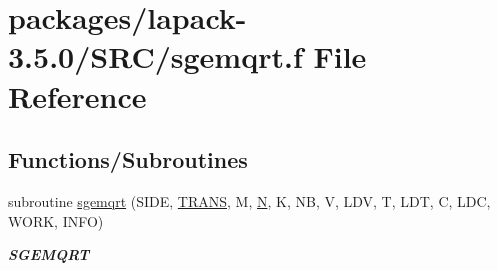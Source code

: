 \hypertarget{sgemqrt_8f}{}\section{packages/lapack-\/3.5.0/\+S\+R\+C/sgemqrt.f File Reference}
\label{sgemqrt_8f}
\subsection*{Functions/\+Subroutines}
\begin{DoxyCompactItemize}
\item 
subroutine \hyperlink{group__realGEcomputational_ga867bbfcb127db8f51ef22f7b29089ca7}{sgemqrt} (S\+I\+D\+E, \hyperlink{superlu__enum__consts_8h_a0c4e17b2d5cea33f9991ccc6a6678d62a1f61e3015bfe0f0c2c3fda4c5a0cdf58}{T\+R\+A\+N\+S}, M, \hyperlink{polmisc_8c_a0240ac851181b84ac374872dc5434ee4}{N}, K, N\+B, V, L\+D\+V, T, L\+D\+T, C, L\+D\+C, W\+O\+R\+K, I\+N\+F\+O)
\begin{DoxyCompactList}\small\item\em {\bfseries S\+G\+E\+M\+Q\+R\+T} \end{DoxyCompactList}\end{DoxyCompactItemize}
